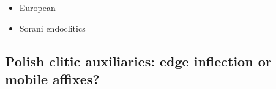 \documentclass[output=paper
 	        ,biblatex
                ,babelshorthands
                ,newtxmath
                ,draftmode
                ,colorlinks, citecolor=brown
]{langscibook}
\begin{document}
\begin{itemize}
\item European  \citep{crysmann_b03book}
  
\item Sorani  endoclitics \citep{Bonami08f,Walther12}

\end{itemize}

\subsection{Polish clitic auxiliaries: edge inflection or mobile affixes?}

\citet{borsley_r99} \citet{Kupsc05} \citet{crysmann_b09degruyter}



 

\printbibliography[heading=subbibliography,notkeyword=this] 
\end{document}
